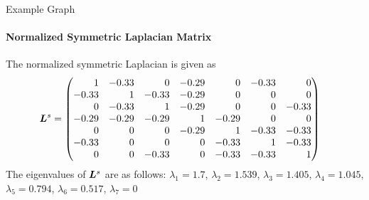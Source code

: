 \begin{frame}{Example Graph}
\framesubtitle{Normalized Symmetric Laplacian Matrix}
\begin{figure}
    \centerline{
	}
		\vspace{-0.2in}
 \end{figure}
\small
The    normalized symmetric Laplacian is given as
    \begin{align*}
        \bL^s & = \amatr{r}{
     1 &-0.33 & 0 &-0.29 & 0 &-0.33 & 0\\
    -0.33 & 1 &-0.33 &-0.29 & 0 & 0 & 0\\
     0 &-0.33 & 1 &-0.29 & 0 & 0 &-0.33\\
    -0.29 &-0.29 &-0.29 & 1 &-0.29 & 0 & 0\\
     0 & 0 & 0 &-0.29 & 1 &-0.33 &-0.33\\
    -0.33 & 0 & 0 & 0 &-0.33 & 1 &-0.33\\
     0 & 0 &-0.33 & 0 &-0.33 &-0.33 & 1\\
    }
    \end{align*}
    The eigenvalues of ${\boldsymbol L}^s$ are as follows:
    $\lambda_1 = 1.7$,
    $\lambda_2 =1.539$,
    $\lambda_3 = 1.405$,
    $\lambda_4 =1.045$,
    $\lambda_5 =0.794$,
    $\lambda_6 =0.517$,
    $\lambda_7 = 0 $
\end{frame}



